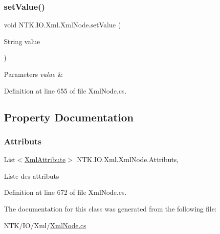 \mbox{\label{class_n_t_k_1_1_i_o_1_1_xml_1_1_xml_node_ab64ccf1caa131653a4f62810a3e82c9e}} 
\subsubsection{\texorpdfstring{setValue()}{setValue()}}
{\footnotesize\ttfamily void N\+T\+K.\+I\+O.\+Xml.\+Xml\+Node.\+set\+Value (\begin{DoxyParamCaption}\item[{String}]{value }\end{DoxyParamCaption})}






\begin{DoxyParams}{Parameters}
{\em value} & \\
\hline
\end{DoxyParams}


Definition at line 655 of file Xml\+Node.\+cs.



\subsection{Property Documentation}
\mbox{\label{class_n_t_k_1_1_i_o_1_1_xml_1_1_xml_node_af951236e53f51065bb7208d49bdead90}} 
\subsubsection{\texorpdfstring{Attributs}{Attributs}}
{\footnotesize\ttfamily List$<$\mbox{\hyperlink{class_n_t_k_1_1_i_o_1_1_xml_1_1_xml_attribute}{Xml\+Attribute}}$>$ N\+T\+K.\+I\+O.\+Xml.\+Xml\+Node.\+Attributs\hspace{0.3cm}{\ttfamily [get]}, {\ttfamily [set]}}



Liste des attributs 



Definition at line 672 of file Xml\+Node.\+cs.



The documentation for this class was generated from the following file\+:\begin{DoxyCompactItemize}
\item 
N\+T\+K/\+I\+O/\+Xml/\mbox{\hyperlink{_xml_node_8cs}{Xml\+Node.\+cs}}\end{DoxyCompactItemize}

